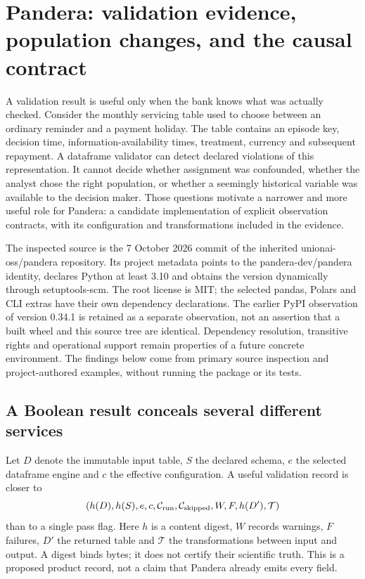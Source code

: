 \section{Pandera: validation evidence, population changes, and the causal contract}
\label{sec:exec24-pandera}

A validation result is useful only when the bank knows what was actually checked.
Consider the monthly servicing table used to choose between an ordinary reminder
and a payment holiday. The table contains an episode key, decision time,
information-availability times, treatment, currency and subsequent repayment.
A dataframe validator can detect declared violations of this representation.
It cannot decide whether assignment was confounded, whether the analyst chose
the right population, or whether a seemingly historical variable was available
to the decision maker. Those questions motivate a narrower and more useful
role for Pandera: a candidate implementation of explicit observation contracts,
with its configuration and transformations included in the evidence.

The inspected source is the 7 October 2026 commit of the inherited
unionai-oss/pandera repository. Its project metadata points to the
pandera-dev/pandera identity, declares Python at least 3.10 and obtains the
version dynamically through setuptools-scm. The root license is MIT; the
selected pandas, Polars and CLI extras have their own dependency declarations.
The earlier PyPI observation of version 0.34.1 is retained as a separate
observation, not an assertion that a built wheel and this source tree are
identical. Dependency resolution, transitive rights and operational support
remain properties of a future concrete environment. The findings below come
from primary source inspection and project-authored examples, without running
the package or its tests.\citep{exec24_pandera_source}

\subsection{A Boolean result conceals several different services}
Let $D$ denote the immutable input table, $S$ the declared schema, $e$ the
selected dataframe engine and $c$ the effective configuration. A useful
validation record is closer to
\begin{equation}
 (h(D),h(S),e,c,\mathcal C_{\rm run},\mathcal C_{\rm skipped},
   W,F,h(D'),\mathcal T)
\end{equation}
than to a single pass flag. Here $h$ is a content digest, $W$ records warnings,
$F$ failures, $D'$ the returned table and $\mathcal T$ the transformations
between input and output. A digest binds bytes; it does not certify their
scientific truth. This is a proposed product record, not a claim that Pandera
already emits every field.

